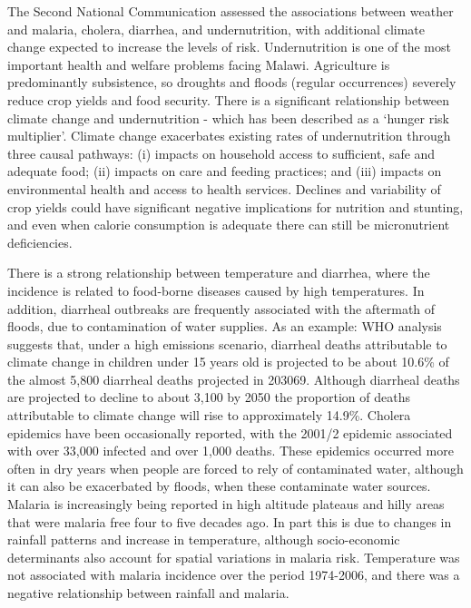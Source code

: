\documentclass[
]{book}
\begin{document}
The Second National Communication assessed the associations between weather and malaria, cholera, diarrhea, and undernutrition, with additional climate change
expected to increase the levels of risk. Undernutrition is one of the most important health and welfare problems facing Malawi. Agriculture is predominantly
subsistence, so droughts and floods (regular occurrences) severely reduce crop yields and food security. There is a significant relationship between climate
change and undernutrition - which has been described as a `hunger risk multiplier'. Climate change exacerbates existing rates of undernutrition through three
causal pathways: (i) impacts on household access to sufficient, safe and adequate food; (ii) impacts on care and feeding practices; and (iii) impacts on
environmental health and access to health services. Declines and variability of crop yields could have significant negative implications for nutrition and
stunting, and even when calorie consumption is adequate there can still be micronutrient deficiencies.

There is a strong relationship between temperature and diarrhea, where the incidence is related to food-borne diseases caused by high temperatures. In addition,
diarrheal outbreaks are frequently associated with the aftermath of floods, due to contamination of water supplies. As an example: WHO analysis suggests that,
under a high emissions scenario, diarrheal deaths attributable to climate change in children under 15 years old is projected to be about 10.6\% of the almost
5,800 diarrheal deaths projected in 203069. Although diarrheal deaths are projected to decline to about 3,100 by 2050 the proportion of deaths attributable to
climate change will rise to approximately 14.9\%. Cholera epidemics have been occasionally reported, with the 2001/2 epidemic associated with over 33,000 infected
and over 1,000 deaths. These epidemics occurred more often in dry years when people are forced to rely of contaminated water, although it can also be exacerbated
by floods, when these contaminate water sources. Malaria is increasingly being reported in high altitude plateaus and hilly areas that were malaria free four to
five decades ago. In part this is due to changes in rainfall patterns and increase in temperature, although socio-economic determinants also account for spatial
variations in malaria risk. Temperature was not associated with malaria incidence over the period 1974-2006, and there was a negative relationship between
rainfall and malaria.
\end{document}
